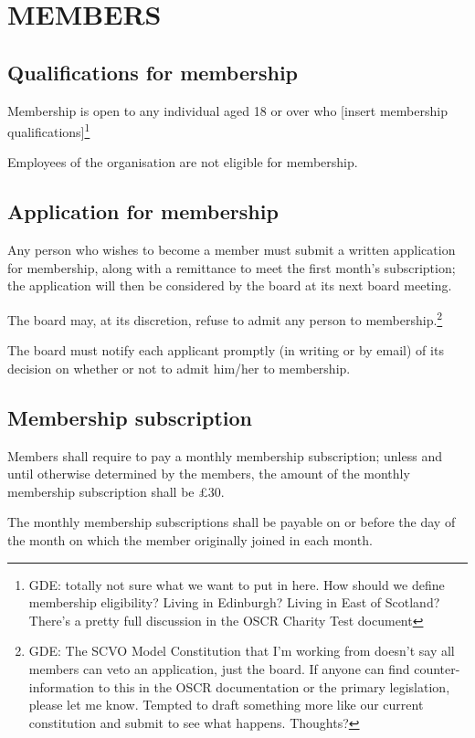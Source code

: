 \documentclass{article}
\begin{document}
\section{MEMBERS}
\subsection{Qualifications for membership}

\clause Membership is open to any individual aged 18 or over who
[insert membership qualifications]\footnote{GDE: totally not sure what
  we want to put in here. How should we define membership eligibility?
  Living in Edinburgh? Living in East of Scotland? There's a pretty
  full discussion in the OSCR Charity Test document}

\clause Employees of the organisation are not eligible for membership.

\subsection{Application for membership}

\clause Any person who wishes to become a member must submit a written
application for membership, along with a remittance to meet the first
month's subscription; the application will then be considered by the
board at its next board meeting.  

\clause The board may, at its discretion, refuse to admit any person
to membership.\footnote{GDE: The SCVO Model Constitution that I'm
  working from doesn't say all members can veto an application, just
  the board. If anyone can find counter-information to this in the
  OSCR documentation or the primary legislation, please let me
  know. Tempted to draft something more like our current constitution
  and submit to see what happens. Thoughts?} 
 
\clause The board must notify each applicant promptly (in writing or
by email) of its decision on whether or not to admit him/her to
membership.

\subsection{Membership subscription}

\clause Members shall require to pay a monthly membership
subscription; unless and until otherwise determined by the members,
the amount of the monthly membership subscription shall be \pounds 30.

\clause The monthly membership subscriptions shall be payable on or
before the day of the month on which the member originally joined in
each month.
\end{document}
